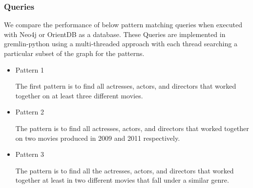 \subsubsection{Queries}

We compare the performance of below pattern matching queries when executed with Neo4j or OrientDB as a database. These Queries are implemented in gremlin-python using a multi-threaded approach with each thread searching a particular subset of the graph for the patterns. 

\begin{itemize}

\item Pattern 1

The first pattern is to find all actresses, actors, and directors that worked together on at least three different movies.

\item Pattern 2

The pattern is to find all actresses, actors, and directors that worked together on two movies produced in 2009 and 2011 respectively.

\item Pattern 3

The pattern is to find all the actresses, actors, and directors that worked together at least in two different movies that fall under a similar genre.

\end{itemize}
